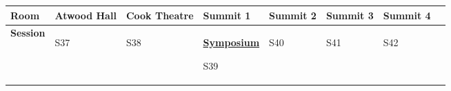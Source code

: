 \begin{tabular}{|x{0.8cm}|x{2.65cm}|x{2.65cm}|a{2.65cm}|y{2.65cm}|x{2.65cm}|x{2.65cm}|@{}m{0pt}@{}}\hline
Room & Atwood Hall & Cook Theatre & Summit 1 & Summit 2 & Summit 3 & Summit 4&\\
\hline
\rule{0pt}{1em} \textbf{Session} &\footnotesize \textbf{} \par S37 & \footnotesize \textbf{} \par S38 & \footnotesize \textbf{\underline{Symposium}} \par \textbf{} \par S39 & \footnotesize \textbf{} \par S40 & \footnotesize \textbf{} \par S41 & \footnotesize \textbf{} \par S42&\\[25ex]
\hline

\end{tabular}
